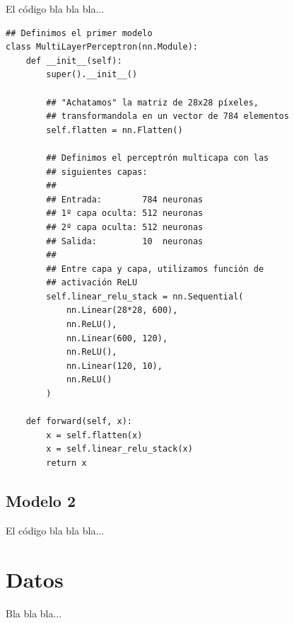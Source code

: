 \documentclass[aps,prl,preprint,groupedaddress]{revtex4-2}
\begin{document}
El código bla bla bla...

\begin{verbatim}
## Definimos el primer modelo
class MultiLayerPerceptron(nn.Module):
    def __init__(self):
        super().__init__()

        ## "Achatamos" la matriz de 28x28 píxeles, 
        ## transformandola en un vector de 784 elementos
        self.flatten = nn.Flatten()

        ## Definimos el perceptrón multicapa con las
        ## siguientes capas:
        ##
        ## Entrada:        784 neuronas
        ## 1º capa oculta: 512 neuronas
        ## 2º capa oculta: 512 neuronas
        ## Salida:         10  neuronas
        ##
        ## Entre capa y capa, utilizamos función de 
        ## activación ReLU
        self.linear_relu_stack = nn.Sequential(
            nn.Linear(28*28, 600),
            nn.ReLU(),
            nn.Linear(600, 120),
            nn.ReLU(),
            nn.Linear(120, 10),
            nn.ReLU()
        )

    def forward(self, x):
        x = self.flatten(x)
        x = self.linear_relu_stack(x)
        return x
\end{verbatim}

\subsection{Modelo 2}

El código bla bla bla...

\section{Datos}

Bla bla bla...
\end{document}
